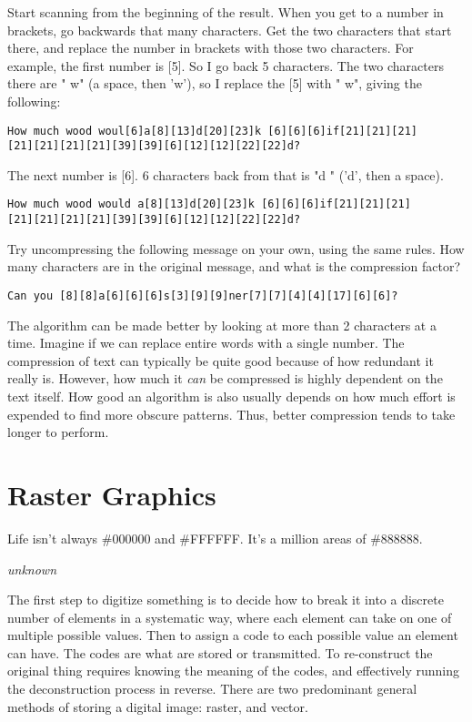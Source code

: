 Start scanning from the beginning of the result. When you get to a number in brackets, go backwards that many characters. Get the two characters that start there, and replace the number in brackets with those two characters. For example, the first number is [5]. So I go back 5 characters. The two characters there are " w" (a space, then 'w'), so I replace the [5] with " w", giving the following:

\begin{verbatim}
How much wood woul[6]a[8][13]d[20][23]k [6][6][6]if[21][21][21]
[21][21][21][21][39][39][6][12][12][22][22]d?
\end{verbatim}

The next number is [6]. 6 characters back from that is "d " ('d', then a space).

\begin{verbatim}
How much wood would a[8][13]d[20][23]k [6][6][6]if[21][21][21]
[21][21][21][21][39][39][6][12][12][22][22]d?
\end{verbatim}

Try uncompressing the following message on your own, using the same rules. How many characters are in the original message, and what is the compression factor?

\begin{verbatim}
Can you [8][8]a[6][6][6]s[3][9][9]ner[7][7][4][4][17][6][6]?
\end{verbatim}

The algorithm can be made better by looking at more than 2 characters at a time. Imagine if we can replace entire words with a single number. The compression of text can typically be quite good because of how redundant it really is. However, how much it \textit{can} be compressed is highly dependent on the text itself. How good an algorithm is also usually depends on how much effort is expended to find more obscure patterns. Thus, better compression tends to take longer to perform.

\section{Raster Graphics}

\epigraph{Life isn't always \#000000 and \#FFFFFF. It's a million areas of \#888888.}{\textit{unknown}}

The first step to digitize something is to decide how to break it into a discrete number of elements in a systematic way, where each element can take on one of multiple possible values. Then to assign a code to each possible value an element can have. The codes are what are stored or transmitted. To re-construct the original thing requires knowing the meaning of the codes, and effectively running the deconstruction process in reverse. There are two predominant general methods of storing a digital image: raster, and vector.\\

